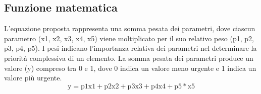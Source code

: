 \subsection{Funzione matematica}
L'equazione proposta rappresenta una somma pesata dei parametri, dove ciascun parametro (x1, x2, x3, x4, x5) viene moltiplicato per il suo relativo peso (p1, p2, p3, p4, p5). I pesi indicano l'importanza relativa dei parametri nel determinare la priorità complessiva di un elemento. La somma pesata dei parametri produce un valore (y) compreso tra 0 e 1, dove 0 indica un valore meno urgente e 1 indica un valore più urgente.
\begin{equation*}
	\text{y} = \text{p1}{\text{x1}} + \text{p2}{\text{x2}}  + \text{p3}{\text{x3}}  + \text{p4}{\text{x4}}  + \text{p5}*{\text{x5}}
\end{equation*}

\clearpage